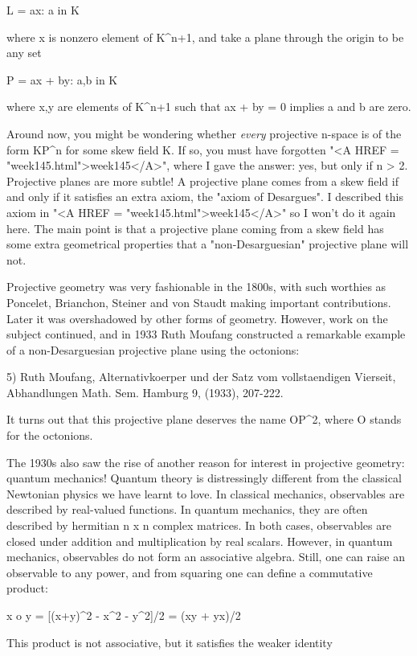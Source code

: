 L = {ax: a in K}

where x is nonzero element of K^{n+1}, and take a plane through the
origin to be any set

P = {ax + by: a,b in K}

where x,y are elements of K^{n+1} such that ax + by = 0
implies a and b are zero.


 Around now, you might be wondering whether \emph{every}
projective n-space is of the form KP^{n} for some skew field
K.  If so, you must have forgotten "<A HREF =
"week145.html">week145</A>", where I gave the answer: yes, but
only if n > 2.  Projective planes are more subtle!  A projective
plane comes from a skew field if and only if it satisfies an extra
axiom, the "axiom of Desargues".  I described this axiom in
"<A HREF = "week145.html">week145</A>" so I won't do it
again here.  The main point is that a projective plane coming from a
skew field has some extra geometrical properties that a
"non-Desarguesian" projective plane will not.

Projective geometry was very fashionable in the 1800s, with such worthies 
as Poncelet, Brianchon, Steiner and von Staudt making important
contributions.  Later it was overshadowed by other forms of geometry.  
However, work on the subject continued, and in 1933 Ruth Moufang
constructed a remarkable example of a non-Desarguesian projective plane
using the octonions:

5) Ruth Moufang, Alternativkoerper und der Satz vom vollstaendigen
Vierseit, Abhandlungen Math. Sem. Hamburg 9, (1933), 207-222.

It turns out that this projective plane deserves the name OP^{2}, 
where O stands for the octonions.  

The 1930s also saw the rise of another reason for interest in projective
geometry: quantum mechanics!  Quantum theory is distressingly different
from the classical Newtonian physics we have learnt to love.  In
classical mechanics, observables are described by real-valued functions.
In quantum mechanics, they are often described by hermitian n x n
complex matrices.   In both cases, observables are closed under addition
and multiplication by real scalars.  However, in quantum mechanics,
observables do not form an associative algebra.  Still, one can raise an
observable to any power, and from squaring one can define a commutative 
product:

x o y = [(x+y)^{2} - x^{2} - y^{2}]/2 = (xy + yx)/2

This product is not associative, but it satisfies the weaker identity

